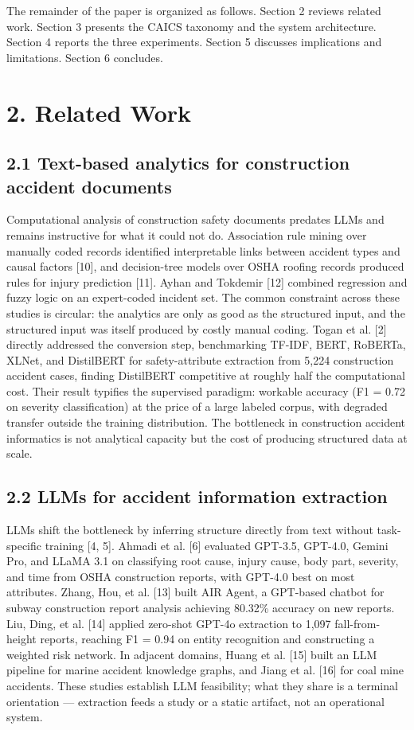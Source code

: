 \documentclass[11pt]{article}
\begin{document}
The remainder of the paper is organized as follows. Section 2 reviews related work. Section 3 presents the CAICS taxonomy and the system architecture. Section 4 reports the three experiments. Section 5 discusses implications and limitations. Section 6 concludes.

\section{2. Related Work}
\subsection{2.1 Text-based analytics for construction accident documents}
Computational analysis of construction safety documents predates LLMs and remains instructive for what it could not do. Association rule mining over manually coded records identified interpretable links between accident types and causal factors [10], and decision-tree models over OSHA roofing records produced rules for injury prediction [11]. Ayhan and Tokdemir [12] combined regression and fuzzy logic on an expert-coded incident set. The common constraint across these studies is circular: the analytics are only as good as the structured input, and the structured input was itself produced by costly manual coding. Togan et al. [2] directly addressed the conversion step, benchmarking TF-IDF, BERT, RoBERTa, XLNet, and DistilBERT for safety-attribute extraction from 5,224 construction accident cases, finding DistilBERT competitive at roughly half the computational cost. Their result typifies the supervised paradigm: workable accuracy (F1 = 0.72 on severity classification) at the price of a large labeled corpus, with degraded transfer outside the training distribution. The bottleneck in construction accident informatics is not analytical capacity but the cost of producing structured data at scale.

\subsection{2.2 LLMs for accident information extraction}
LLMs shift the bottleneck by inferring structure directly from text without task-specific training [4, 5]. Ahmadi et al. [6] evaluated GPT-3.5, GPT-4.0, Gemini Pro, and LLaMA 3.1 on classifying root cause, injury cause, body part, severity, and time from OSHA construction reports, with GPT-4.0 best on most attributes. Zhang, Hou, et al. [13] built AIR Agent, a GPT-based chatbot for subway construction report analysis achieving 80.32\% accuracy on new reports. Liu, Ding, et al. [14] applied zero-shot GPT-4o extraction to 1,097 fall-from-height reports, reaching F1 = 0.94 on entity recognition and constructing a weighted risk network. In adjacent domains, Huang et al. [15] built an LLM pipeline for marine accident knowledge graphs, and Jiang et al. [16] for coal mine accidents. These studies establish LLM feasibility; what they share is a terminal orientation --- extraction feeds a study or a static artifact, not an operational system.
\end{document}

